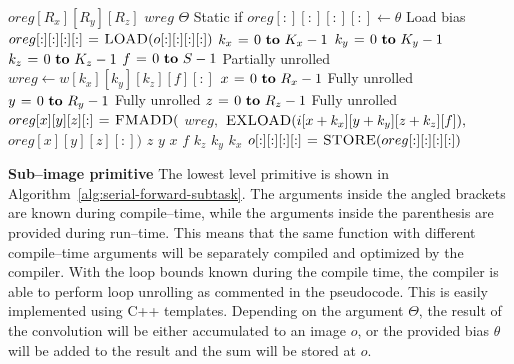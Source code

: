   \begin{algorithm}
    {\footnotesize
      \begin{codebox}
        \li {} $oreg[R_x][R_y][R_z]$
        \li {} $wreg$
        \li \If $\Theta$ \Comment Static if
        \li \Then $oreg[:][:][:][:] \gets \theta$ \Comment Load bias
        \li \Else
        \li       $oreg[:][:][:][:] \mathrel{\hspace{1pt}=\hspace{1pt}} \textnormal{\scshape LOAD}(o[:][:][:][:])$
        \End \li {}
        \li {} $k_x \gets 0 \To K_x-1$
        \li   \Do {} $k_y \gets 0 \To K_y-1$
        \li      \Do {} $k_z \gets 0 \To K_z-1$
        \li         \Do {} $f \gets 0 \To S - 1$ \Comment Partially unrolled
        \li         \Do $wreg \gets w[k_x][k_y][k_z][f][:]$
        \li {} $x \gets 0 \To R_x-1$ \Comment Fully unrolled
        \li   \Do {} $y \gets 0 \To R_y-1$ \Comment Fully unrolled
        \li      \Do {} $z \gets 0 \To R_z-1$ \Comment Fully unrolled
        \li         \Do $oreg[x][y][z][:] \mathrel{\hspace{1pt}=\hspace{1pt}} \textnormal{\scshape FMADD}($
        \li       $wreg,$
        \li       $\textnormal{\scshape EXLOAD}(i[x+k_x][y+k_y][z+k_z][f]),$
        \li       $oreg[x][y][z][:])$
        \End \li {} $z$
        \End \li {} $y$
        \End \li {} $x$
        \End \li {} $f$
        \End \li {} $k_z$
        \End \li {} $k_y$
        \End \li {} $k_x$
        \li $o[:][:][:][:] \mathrel{\hspace{1pt}=\hspace{1pt}} \textnormal{\scshape STORE}(oreg[:][:][:][:])$
      \end{codebox}
    \caption{The finest granularity primitive that computes a
      sub--image of size $R_x \times R_y \times R_z$ of $S$ images by
      performing $S^2$ convolutions on $S$ input images with kernels
      of size $K_x \times K_y \times K_z$.}
    \label{alg:serial-forward-subtask}
    }
  \end{algorithm}

  {\bf Sub--image primitive} \quad The lowest level primitive is shown
  in Algorithm~\ref{alg:serial-forward-subtask}.  The arguments inside
  the angled brackets are known during compile--time, while the
  arguments inside the parenthesis are provided during run--time.
  This means that the same function with different compile--time
  arguments will be separately compiled and optimized by the compiler.
  With the loop bounds known during the compile time, the compiler is
  able to perform loop unrolling as commented in the pseudocode.  This
  is easily implemented using C++ templates.  Depending on the
  argument $\Theta$, the result of the convolution will be either
  accumulated to an image $o$, or the provided bias $\theta$ will be
  added to the result and the sum will be stored at $o$.

